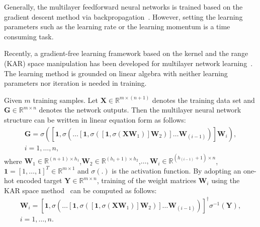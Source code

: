 \documentclass[sigconf]{acmart}
\begin{document}
Generally, the multilayer feedforward neural networks is trained based on the gradient descent method via backpropagation~\cite{goodfellow2016deep}.
However, setting the learning parameters such as the learning rate or the learning momentum is a time consuming task.

Recently, a gradient-free learning framework based on the kernel and the range (KAR) space manipulation has been developed for multilayer network learning~\cite{toh2018learning,toh2018gradient}.
The learning method is grounded on linear algebra with neither learning parameters nor iteration is needed in training.

Given $m$ training samples. Let $\mathbf{X}\in{\mathbb{R}}^{m \times (n+1)}$ denotes the training data set and $\mathbf{G}\in{\mathbb{R}}^{m \times n}$ denotes the network outputs.
Then the multilayer neural network structure can be written in linear equation form as follows:
\begin{equation}
\begin{split}    
    \mathbf{G} = \sigma\left(\left[\mathbf{1},\sigma\left(\dots\left[\mathbf{1},\sigma\left(\left[\mathbf{1},\sigma\left(\mathbf{X}\mathbf{W}_{1}\right)\right]\mathbf{W}_{2}\right)\right]\dots\mathbf{W}_{(i-1)}\right)\right]\mathbf{W}_{i}\right),\\ i=1,\dotsc,n,
\end{split}
\end{equation}
where $\mathbf{W}_{1}\in{\mathbb{R}}^{(n+1) \times h_{1}}$,$\mathbf{W}_{2}\in{\mathbb{R}}^{(h_{1}+1) \times h_{2}}$,$\dots,\mathbf{W}_{i}\in{\mathbb{R}}^{(h_{(i-1)}+1) \times n}$,\\$\mathbf{1}=\left[1,\dots,1\right]^{T}\in{\mathbb{R}}^{m \times 1}$ and $\sigma(.)$ is the activation function.
By adopting an one-hot encoded target $\mathbf{Y}\in{\mathbb{R}}^{m \times n}$, training of the weight matrices $\mathbf{W}_{i}$ using the KAR space method~\cite{toh2018gradient} can be computed as follows:
\begin{equation}
\begin{split}
    \mathbf{W}_{i} = \left[\mathbf{1},\sigma\left(\dots\left[\mathbf{1},\sigma\left(\left[\mathbf{1},\sigma\left(\mathbf{X}\mathbf{W}_{1}\right)\right]\mathbf{W}_{2}\right)\right]\dots\mathbf{W}_{(i-1)}\right)\right]^{\dagger}\sigma^{-1}\left(\mathbf{Y}\right), \\ i=1,\dotsc,n.
\end{split}
\end{equation}
\end{document}
